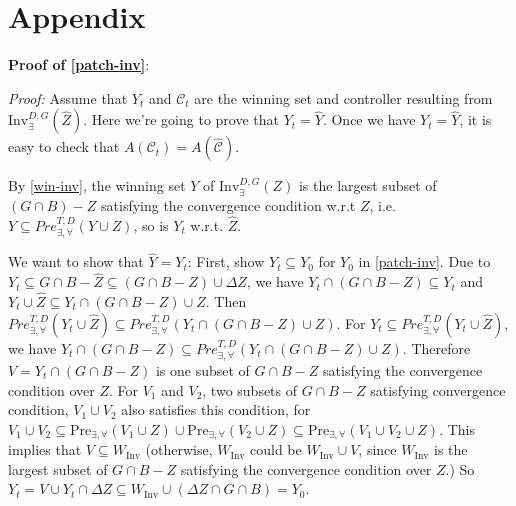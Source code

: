 
\iffalse
\section{Appendix}
\textbf{Proof of \eqref{patch-inv}}:

\emph{Proof:}
	Assume that $ Y_t $ and $ \mathcal{C}_t $ are the winning set and controller resulting from $ \text{Inv}_{\exists}^{D,G} (\widehat{Z}) $. Here we're going to prove that $ Y_t=\widehat{Y}$. Once we have $ Y_t=\widehat{Y}$, it is easy to check that $ A(\mathcal{C}_t) = A(\widehat{\mathcal{C}}) $.
	
	By \eqref{win-inv}, the winning set $ Y $ of $ \text{Inv}_{\exists}^{D,G} (Z) $ is the largest subset of $ (G\cap B) - Z  $ satisfying the convergence condition w.r.t $ Z $, i.e. $ Y \subseteq Pre^{T,D}_{\exists, \forall}(Y\cup Z) $, so is $ Y_t $ w.r.t. $ \widehat{Z} $.
	
	We want to show that $ \widehat{Y} = Y_t$: First, show $ Y_t \subseteq Y_0 $ for $ Y_0 $ in \eqref{patch-inv}. Due to $ Y_t \subseteq G\cap B-\widehat{Z} \subseteq (G\cap B -Z)\cup \Delta Z $, we have $ Y_t\cap (G\cap B-Z)\subseteq Y_t $ and $ Y_t\cup \widehat{Z} \subseteq Y_t\cap (G\cap B-Z)\cup Z$. Then $ Pre^{T,D}_{\exists,\forall}(Y_t\cup \widehat{Z}) \subseteq Pre^{T,D}_{\exists,\forall}(Y_t\cap (G\cap B-Z)\cup Z)$. For $ Y_t \subseteq Pre^{T,D}_{\exists,\forall}(Y_t\cup \widehat{Z})$, we have $ Y_t\cap (G\cap B-Z)\subseteq Pre^{T,D}_{\exists,\forall}(Y_t\cap (G\cap B-Z)\cup Z) $. Therefore $ V= Y_t \cap (G\cap B -Z) $ is one subset of $ G\cap B -Z $ satisfying the convergence condition over $ Z $. For $ V_1 $ and $ V_2 $, two subsets of $ G\cap B-Z $ satisfying convergence condition, $ V_1\cup V_2 $ also satisfies this condition, for $ V_1\cup V_2\subseteq \text{Pre}_{\exists,\forall}(V_1\cup Z)\cup \text{Pre}_{\exists,\forall}(V_2\cup Z)\subseteq \text{Pre}_{\exists,\forall}(V_1\cup V_2\cup Z) $. This implies that $ V \subseteq W_{\text{Inv}} $ (otherwise, $ W_{\text{Inv}} $ could be $ W_{\text{Inv}}\cup V $, since $ W_{\text{Inv}} $ is the largest subset of $ G\cap B-Z $ satisfying the convergence condition over $ Z $.) So $ Y_t = V\cup Y_t\cap \Delta Z \subseteq W_{\text{Inv}}\cup (\Delta Z \cap G\cap B) = Y_0$. 
	
